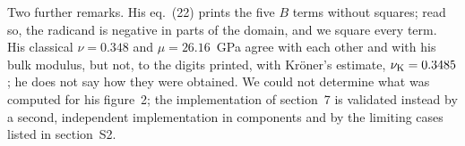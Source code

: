 Two further remarks. His eq.~(22) prints the five $B$ terms without squares; read so, the
radicand is negative in parts of the domain, and we square every term. His classical
$\nu=0.348$ and $\mu=26.16$~GPa agree with each other and with his bulk modulus, but not, to the
digits printed, with Kr\"oner's estimate, $\nu_{\mathrm K}=0.3485$; he does not say how
they were obtained. We could not determine what was
computed for his figure~2; the implementation of section~7 is validated instead by a second,
independent implementation in components and by the limiting cases listed in section~S2.
